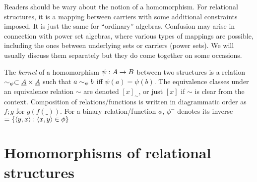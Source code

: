 \documentclass[10pt]{article}
\begin{document}

Readers should be wary about the notion of a homomorphism.
For relational structures,
it is a mapping between carriers with some additional
constraints imposed. It is just the same for ``ordinary''
algebras. Confusion may arise in connection with 
power set algebras, where various types of mappings are possible,
including the ones between underlying sets or carriers (power
sets). We will usually discuss them separately but they do come
together on some occasions. 

The {\em kernel\/} of a homomorphism $\psi :
A \rightarrow B$ between two structures is a relation
$\sim_\psi \subset \underline {A}\times\underline {A}$ 
such that
$a\sim_\psi b$ iff $\psi(a)=\psi(b)$. The equivalence classes under
an equivalence relation $\sim$ are denoted $[x]_\sim$, or just $[x]$ if 
$\sim$ is clear from the context.
Composition of relations/functions is written in diagrammatic order
as $f;g$ for $g(f(\_))$. For a binary relation/function $\phi$, $\phi^-$
 denotes its inverse $=\{\langle y,x\rangle:\langle x,y\rangle\in\phi\}$



\section{Homomorphisms of relational structures}
\label{se:comp}

\end{document}
